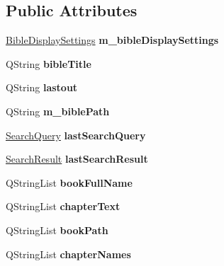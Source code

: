 \subsection*{Public Attributes}
\begin{DoxyCompactItemize}
\item 
\hypertarget{classBible_a61a3a3f88bdc01c6c7a493bdcbd98903}{
\hyperlink{classBibleDisplaySettings}{BibleDisplaySettings} {\bfseries m\_\-bibleDisplaySettings}}
\label{classBible_a61a3a3f88bdc01c6c7a493bdcbd98903}

\item 
\hypertarget{classBible_abced9dd0641201c2081301d2c8ff6c59}{
QString {\bfseries bibleTitle}}
\label{classBible_abced9dd0641201c2081301d2c8ff6c59}

\item 
\hypertarget{classBible_aabb92e73cdb26638d40325e5d708ec7b}{
QString {\bfseries lastout}}
\label{classBible_aabb92e73cdb26638d40325e5d708ec7b}

\item 
\hypertarget{classBible_a1287eeedb0130dcc2b9e9cea653bb4dd}{
QString {\bfseries m\_\-biblePath}}
\label{classBible_a1287eeedb0130dcc2b9e9cea653bb4dd}

\item 
\hypertarget{classBible_a1b406912e4d01a4e4755b17a6b2b3893}{
\hyperlink{classSearchQuery}{SearchQuery} {\bfseries lastSearchQuery}}
\label{classBible_a1b406912e4d01a4e4755b17a6b2b3893}

\item 
\hypertarget{classBible_a62899d799a8c6efcf5283808edb205a7}{
\hyperlink{classSearchResult}{SearchResult} {\bfseries lastSearchResult}}
\label{classBible_a62899d799a8c6efcf5283808edb205a7}

\item 
\hypertarget{classBible_ac3d84e689a0365415980d6f3ebb6e561}{
QStringList {\bfseries bookFullName}}
\label{classBible_ac3d84e689a0365415980d6f3ebb6e561}

\item 
\hypertarget{classBible_af1659c6f7db752f7c722c7880a731957}{
QStringList {\bfseries chapterText}}
\label{classBible_af1659c6f7db752f7c722c7880a731957}

\item 
\hypertarget{classBible_afcf35e16bb50b3be1d60ee74b3f8a48c}{
QStringList {\bfseries bookPath}}
\label{classBible_afcf35e16bb50b3be1d60ee74b3f8a48c}

\item 
\hypertarget{classBible_a21d4ae1646b7a8c816094bcbbec4bc88}{
QStringList {\bfseries chapterNames}}
\label{classBible_a21d4ae1646b7a8c816094bcbbec4bc88}


\end{DoxyCompactItemize}
